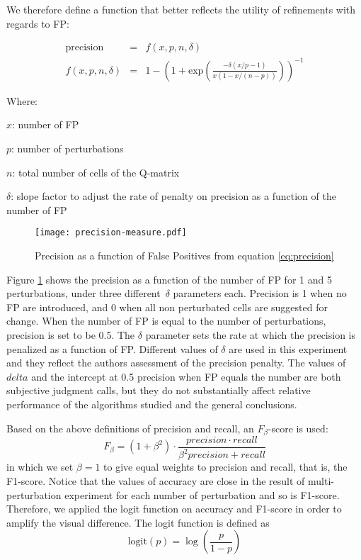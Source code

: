 \documentclass{edm_template}
\begin{document}
We therefore define a function that better reflects the utility of refinements with regards to FP:

\begin{eqnarray}
\mathrm{precision} & = & f(x, p, n, \delta) \\
f(x, p, n, \delta) & = & 1- \left( 1 +  \mathrm{exp}\left( \frac{-\delta (x/p - 1)}{x(1-x/(n-p))} \right) \right)^{-1} \label{eq:precision}
\end{eqnarray}

Where:
\begin{compactitem}
\item[$x$:] number of FP
\item[$p$:] number of perturbations
\item[$n$:] total number of cells of the Q-matrix
\item[$\delta$:] slope factor to adjust the rate of penalty on precision as a function of the number of FP
\end{compactitem}

\begin{figure}
  \centerline{\texttt{[image: precision-measure.pdf]}}
  \caption{Precision as a function of False Positives from equation \ref{eq:precision}}
  \label{fig:precision}
\end{figure}

Figure \ref{fig:precision} shows the precision as a function of the number of FP for 1 and 5 perturbations, under three different~$\delta$ parameters each.  Precision is 1 when no FP are introduced, and 0 when all non perturbated cells are suggested for change.  When the number of FP is equal to the number of perturbations, precision is set to be 0.5. The $\delta$ parameter sets the rate at which the precision is penalized as a function of FP.  Different values of $\delta$ are used in this experiment and they reflect the authors assessment of the precision penalty.  The values of $delta$ and the intercept at 0.5 precision when FP equals the number are both subjective judgment calls, but they do not substantially affect relative performance of the algorithms studied and the general conclusions.

Based on the above definitions of precision and recall, an $F_\beta$-score is used:
$$ F_\beta=(1+\beta^2)\cdot \frac{precision \cdot recall}{\beta^2precision + recall}$$
in which we set $\beta=1$ to give equal weights to precision and recall, that is, the F1-score. Notice that the values of accuracy are close in the result of multi-perturbation experiment for each number of perturbation and so is F1-score. Therefore, we applied the logit function on accuracy and F1-score in order to amplify the visual difference. The logit function is defined as
$$ \mathrm{logit}(p)=\log\left(\frac{p}{1-p}\right) $$
\end{document}
